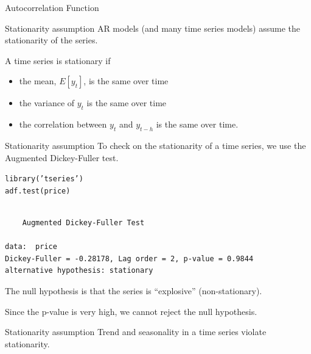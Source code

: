 \documentclass{beamer}\usepackage[]{graphicx}\usepackage[]{color}
\makeatletter
\newcommand{\hlstr}[1]{\textcolor[rgb]{1,0.894,0.71}{#1}}%
\newcommand{\hlstd}[1]{\textcolor[rgb]{1,0.894,0.769}{#1}}%
\newcommand{\hlkwd}[1]{\textcolor[rgb]{1,0.78,0.769}{#1}}%
\newenvironment{kframe}{%
 \def\at@end@of@kframe{}%
 \ifinner\ifhmode%
  \def\at@end@of@kframe{\end{minipage}}%
  \begin{minipage}{\columnwidth}%
 \fi\fi%
 \def\FrameCommand##1{\hskip\@totalleftmargin \hskip-\fboxsep
 \colorbox{shadecolor}{##1}\hskip-\fboxsep
     \hskip-\linewidth \hskip-\@totalleftmargin \hskip\columnwidth}%
 \MakeFramed {\advance\hsize-\width
   \@totalleftmargin\z@ \linewidth\hsize
   \@setminipage}}%
 {\par\unskip\endMakeFramed%
 \at@end@of@kframe}
\newenvironment{knitrout}{}{} %
\makeatother
\begin{document}
\begin{darkframes}
\begin{frame}[fragile]{Autocorrelation Function}
\begin{knitrout}
\end{knitrout}
    \end{frame}
    
    
    
    \begin{frame}[fragile]{Stationarity assumption} 
      \fontsize{8}{8}\selectfont
      AR models (and many time series models) assume the stationarity of the series. \pause
      \bigskip
      
      A time series is stationary if
      \begin{itemize}
        \item the mean, $E[y_t]$, is the same over time
        \item the variance of $y_t$ is the same over time
        \item the correlation between $y_{t}$ and $y_{t-h}$ is the same over time.
      \end{itemize}
    
    \end{frame}
    
    
    
    \begin{frame}[fragile]{Stationarity assumption}
    \fontsize{9}{9}\selectfont
    To check on the stationarity of a time series, we use the Augmented Dickey-Fuller test. \pause
    \bigskip
\begin{knitrout}
\begin{kframe}
\begin{alltt}
\hlkwd{library}\hlstd{(}\hlstr{'tseries'}\hlstd{)}
\hlkwd{adf.test}\hlstd{(price)}
\end{alltt}
\begin{verbatim}

	Augmented Dickey-Fuller Test

data:  price
Dickey-Fuller = -0.28178, Lag order = 2, p-value = 0.9844
alternative hypothesis: stationary
\end{verbatim}
\end{kframe}
\end{knitrout}
      \pause
      The null hypothesis is that the series is ``explosive'' (non-stationary). \pause
      
      Since the p-value is very high, we cannot reject the null hypothesis.
    \end{frame}
      
    
    
    \begin{frame}[fragile]{Stationarity assumption}
    \fontsize{9}{9}\selectfont
      Trend and seasonality in a time series violate stationarity. \pause
      \bigskip
      

\end{frame}
\end{darkframes}
\end{document}
